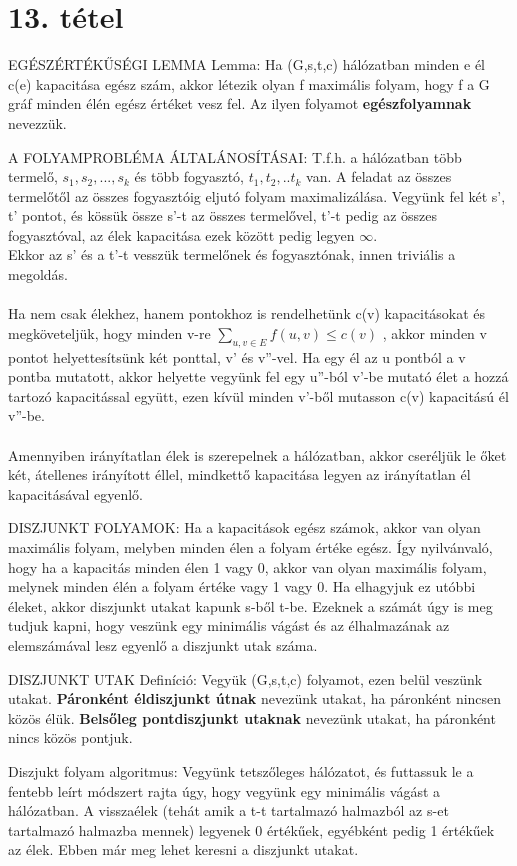 \section{13. tétel}

\begin{framed}
EGÉSZÉRTÉKŰSÉGI LEMMA Lemma: Ha (G,s,t,c) hálózatban minden e él c(e) kapacitása egész szám, akkor létezik olyan f maximális folyam, hogy f a G gráf minden élén egész értéket vesz fel. Az ilyen folyamot \textbf{egészfolyamnak} nevezzük.
\end{framed}
\begin{framed}
A FOLYAMPROBLÉMA ÁLTALÁNOSÍTÁSAI: T.f.h. a hálózatban több termelő, $s_1, s_2,...,s_k$ és több fogyasztó, $t_1, t_2,..t_k$ van. A feladat az összes termelőtől az összes fogyasztóig eljutó folyam maximalizálása. Vegyünk fel két s', t' pontot, és kössük össze s'-t az összes termelővel, t'-t pedig az összes fogyasztóval, az élek kapacitása ezek között pedig legyen $\infty$.
\\
Ekkor az s' és a t'-t vesszük termelőnek és fogyasztónak, innen triviális a megoldás.
\\
\\
Ha nem csak élekhez, hanem pontokhoz is rendelhetünk c(v) kapacitásokat és megköveteljük, hogy minden v-re
$\sum_{u,v\in E}^{} f(u,v) \leq c(v)$
, akkor minden v pontot helyettesítsünk két ponttal, v' és v''-vel. Ha egy él az u pontból a v pontba mutatott, akkor helyette vegyünk fel egy u''-ból v'-be mutató élet a hozzá tartozó kapacitással együtt, ezen kívül minden v'-ből mutasson c(v) kapacitású él v''-be.
\\
\\
Amennyiben irányítatlan élek is szerepelnek a hálózatban, akkor cseréljük le őket két, átellenes irányított éllel, mindkettő kapacitása legyen az irányítatlan él kapacitásával egyenlő.
\end{framed}
\begin{framed}
DISZJUNKT FOLYAMOK: Ha a kapacitások egész számok, akkor van olyan maximális folyam, melyben minden élen a folyam értéke egész. Így nyilvánvaló, hogy ha a kapacitás minden élen 1 vagy 0, akkor van olyan maximális folyam, melynek minden élén a folyam értéke vagy 1 vagy 0. Ha elhagyjuk ez utóbbi éleket, akkor diszjunkt utakat kapunk s-ből t-be. Ezeknek a számát úgy is meg tudjuk kapni, hogy veszünk egy minimális vágást és az élhalmazának az elemszámával lesz egyenlő a diszjunkt utak száma.
\end{framed}
\begin{shaded}
DISZJUNKT UTAK Definíció: Vegyük (G,s,t,c) folyamot, ezen belül veszünk utakat. \textbf{Páronként éldiszjunkt útnak} nevezünk utakat, ha páronként nincsen közös élük. \textbf{Belsőleg pontdiszjunkt utaknak} nevezünk utakat, ha páronként nincs közös pontjuk.
\end{shaded}
Diszjukt folyam algoritmus: Vegyünk tetszőleges hálózatot, és futtassuk le a fentebb leírt módszert rajta úgy, hogy vegyünk egy minimális vágást a hálózatban. A visszaélek (tehát amik a t-t tartalmazó halmazból az s-et tartalmazó halmazba mennek) legyenek 0 értékűek, egyébként pedig 1 értékűek az élek. Ebben már meg lehet keresni a diszjunkt utakat.
